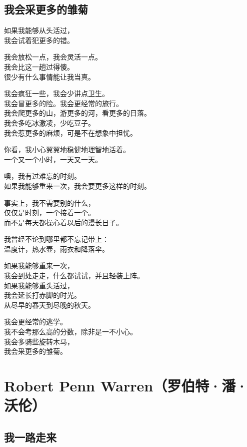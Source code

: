 \documentclass[]{book}
\renewenvironment{quote}{\begin{VF}}{\end{VF}}
\begin{document}
\section{我会采更多的雏菊}

\begin{quote}
如果我能够从头活过，\\
我会试着犯更多的错。

我会放松一点，我会灵活一点。\\
我会比这一趟过得傻。\\
很少有什么事情能让我当真。

我会疯狂一些，我会少讲点卫生。\\
我会冒更多的险。我会更经常的旅行。\\
我会爬更多的山，游更多的河，看更多的日落。\\
我会多吃冰激凌，少吃豆子。\\
我会惹更多的麻烦，可是不在想象中担忧。

你看，我小心翼翼地稳健地理智地活着。\\
一个又一个小时，一天又一天。

噢，我有过难忘的时刻。\\
如果我能够重来一次，我会要更多这样的时刻。

事实上，我不需要别的什么，\\
仅仅是时刻，一个接着一个。\\
而不是每天都操心着以后的漫长日子。

我曾经不论到哪里都不忘记带上：\\
温度计，热水壶，雨衣和降落伞。

如果我能够重来一次，\\
我会到处走走，什么都试试，并且轻装上阵。\\
如果我能够重头活过，\\
我会延长打赤脚的时光。\\
从尽早的春天到尽晚的秋天。

我会更经常的逃学。\\
我不会考那么高的分数，除非是一不小心。\\
我会多骑些旋转木马，\\
我会采更多的雏菊。
\end{quote}

\chapter{Robert Penn Warren（罗伯特·潘·沃伦）}\label{robert-penn-warren}

\section{我一路走来}
\end{document}
